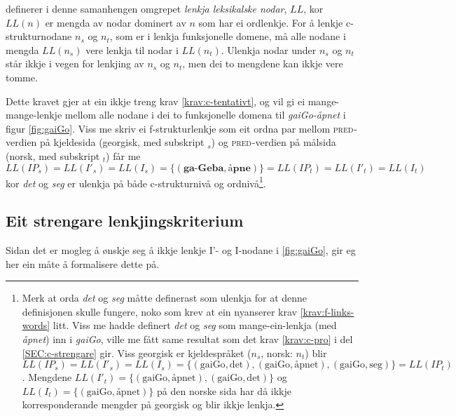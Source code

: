 \documentclass[11pt,a4paper,oneside,draft]{report}
\newcommand{\F}[2]{\textsc{#1}\ensuremath{_{#2}}}
\newcommand{\PRED}{\F{pred}{}}
\begin{document}
\citet[s.~77]{dyvik2009lmp} definerer i denne samanhengen
omgrepet \emph{lenkja leksikalske nodar}, $LL$, kor $LL(n)$ er mengda av
nodar dominert av $n$ som har ei ordlenkje. For å lenkje
c-strukturnodane $n_s$ og $n_t$, som er i lenkja funksjonelle domene,
må alle nodane i mengda $LL(n_s)$ vere lenkja til nodar i
$LL(n_t)$. Ulenkja nodar under $n_s$ og $n_t$ står ikkje i vegen for
lenkjing av $n_s$ og $n_t$, men dei to mengdene kan ikkje vere tomme.

Dette kravet gjer at ein ikkje treng krav \ref{krav:c-tentativt}, og
vil gi ei mange-mange-lenkje mellom alle nodane i dei to funksjonelle
domena til \emph{gaiGo-åpnet} i figur \ref{fig:gaiGo}. Viss me skriv ei
f-strukturlenkje som eit ordna par mellom \PRED{}-verdien på kjeldesida
(georgisk, med subskript $_s$) og \PRED{}-verdien på målsida (norsk, med
subskript $_t$) får me
$LL(IP_s)=LL(I'_s)=LL(I_s)=\{(\textbf{ga-Geba},\textbf{åpne})\}=LL(IP_t)=LL(I'_t)=LL(I_t)$
kor \emph{det} og \emph{seg} er ulenkja på både c-strukturnivå og ordnivå\footnote{\label{fn:LL-ordlenkje} Merk at orda \emph{det} og \emph{seg} måtte definerast som ulenkja for
        at denne definisjonen skulle fungere, noko som krev at ein nyanserer
        krav \ref{krav:f-links-words} litt. Viss me hadde definert
        \emph{det} og \emph{seg} som mange-ein-lenkja (med \emph{åpnet}) inn i
        \emph{gaiGo}, ville me fått same resultat som det krav
        \ref{krav:c-pro} i del \ref{SEC:c-strengare} gir.
        Viss georgisk er kjeldespråket
        ($n_s$, norsk: $n_t$) blir
        $LL(IP_s)=LL(I'_s)=LL(I_s)=\{(\text{gaiGo},\text{det}),(\text{gaiGo},\text{åpnet}),(\text{gaiGo},\text{seg})\}=LL(IP_t)$.
        Mengdene
        $LL(I'_t)=\{(\text{gaiGo},\text{åpnet}),(\text{gaiGo},\text{det})\}$
        og $LL(I_t)=\{(\text{gaiGo},\text{åpnet})\}$ på den norske
        sida har då ikkje korresponderande mengder på georgisk og blir
        ikkje lenkja. }.


\subsection{Eit strengare lenkjingskriterium}
\label{sec-3.7.2}

\label{SEC:c-strengare}

Sidan det er mogleg å ønskje seg å ikkje lenkje I'- og I-nodane i
\ref{fig:gaiGo}, gir eg her ein måte å formalisere dette på.
\end{document}

